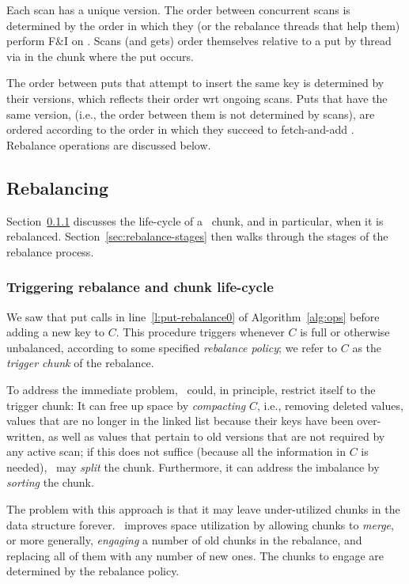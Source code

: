 Each scan has a unique version. The order between concurrent scans is determined by
the order in which they (or the rebalance threads that help them) perform F\&I on .
Scans (and gets) order themselves relative to a put by thread  via  in the chunk where the put occurs.

The order between puts that attempt to  insert the same key is determined by their versions, which reflects their order wrt ongoing scans.
Puts that have the same version, (i.e., the order between them is not determined by scans), are ordered according to
the order in which they succeed to fetch-and-add  .
Rebalance operations are discussed below.




\subsection{Rebalancing}
\label{sec:rebalance}

Section~\ref{sec:rebalance-trigger} discusses the life-cycle of a \kiwi\ chunk, and in particular,
when it is rebalanced. Section~\ref{sec:rebalance-stages} then walks through the stages of the rebalance process.

\subsubsection{Triggering rebalance and chunk life-cycle}
\label{sec:rebalance-trigger}

We saw that put calls  in line~\ref{l:put-rebalance0} of Algorithm~\ref{alg:ops} before adding a new key to $C$.
This procedure triggers  whenever $C$ is full or otherwise unbalanced, according
to some specified \emph{rebalance policy}; we refer to $C$ as the \emph{trigger chunk} of the rebalance.

To address the immediate problem, \kiwi\ could, in principle, restrict itself to the trigger chunk:
It can free up space by \emph{compacting} $C$, i.e., removing deleted values, values that are no longer in the linked list
because their keys have been over-written, as well as values that pertain to old versions that are not required by any active scan;
if this does not suffice (because all the information in $C$ is needed), \kiwi\ may \emph{split} the chunk.
Furthermore, it can address the imbalance  by \emph{sorting} the chunk.

The problem with this approach is that it may leave under-utilized chunks in the data structure forever.
\kiwi\ improves space utilization by allowing chunks to \emph{merge}, or more generally,
\emph{engaging} a number of old chunks in the rebalance,
and replacing all of them with any number of new ones.
The chunks to engage are determined by the rebalance policy.

